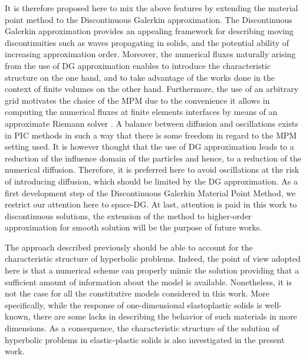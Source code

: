 It is therefore proposed here to mix the above features by extending the material point method to the Discontinuous Galerkin approximation.
The Discontinuous Galerkin approximation provides an appealing framework for describing moving discontinuities such as waves propagating in solids, and the potential ability of increasing approximation order.
Moreover, the numerical fluxes naturally arising from the use of DG approximation enables to introduce the characteristic structure on the one hand, and to take advantage of the works done in the context of finite volumes on the other hand.
Furthermore, the use of an arbitrary grid motivates the choice of the MPM due to the convenience it allows in computing the numerical fluxes at finite elements interfaces by means of an approximate Riemann solver \cite{Toro}.
A balance between diffusion and oscillations exists in PIC methods in such a way that there is some freedom in regard to the MPM setting used.
It is however thought that the use of DG approximation leads to a reduction of the influence domain of the particles and hence, to a reduction of the numerical diffusion. 
Therefore, it is preferred here to avoid oscillations at the risk of introducing diffusion, which should be limited by the DG approximation.
As a first development step of the Discontinuous Galerkin Material Point Method, we restrict our attention here to space-DG.
At last, attention is paid in this work to discontinuous solutions, the extension of the method to higher-order approximation for smooth solution will be the purpose of future works.

The approach described previously should be able to account for the characteristic structure of hyperbolic problems.
Indeed, the point of view adopted here is that a numerical scheme can properly mimic the solution providing that a sufficient amount of information about the model is available.
Nonetheless, it is not the case for all the constitutive models considered in this work.
More specifically, while the response of one-dimensional elastoplastic solids is well-known, there are some lacks in describing the behavior of such materials in more dimensions. 
As a consequence, the characteristic structure of the solution of hyperbolic problems in elastic-plastic solids is also investigated in the present work.








